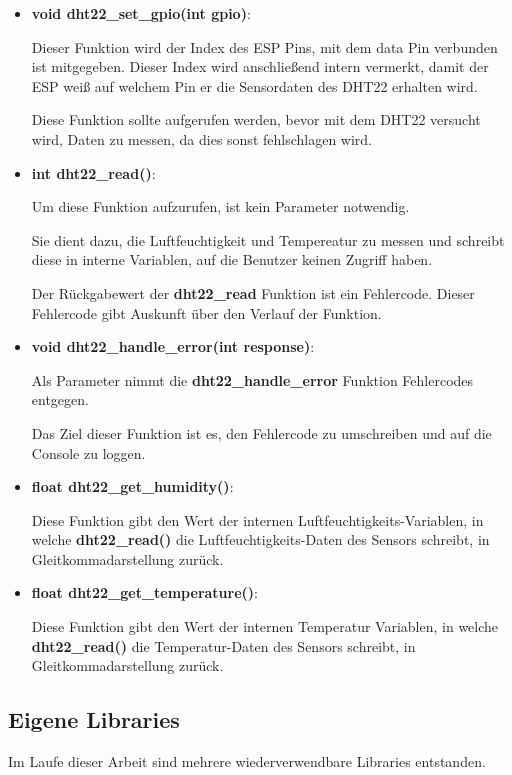 \begin{itemize}
    \item \textbf{void dht22\_set\_gpio(int gpio)}:

    Dieser Funktion wird der Index des ESP Pins, mit dem data Pin verbunden ist mitgegeben. Dieser Index wird anschließend intern vermerkt, damit der ESP weiß auf welchem Pin er die Sensordaten des DHT22 erhalten wird.
    
    Diese Funktion sollte aufgerufen werden, bevor mit dem DHT22 versucht wird, Daten zu messen, da dies sonst fehlschlagen wird.
    \item \textbf{int dht22\_read()}:

    Um diese Funktion aufzurufen, ist kein Parameter notwendig.

    Sie dient dazu, die Luftfeuchtigkeit und Tempereatur zu messen und schreibt diese in interne Variablen, auf die Benutzer keinen Zugriff haben.

    Der Rückgabewert der \textbf{dht22\_read} Funktion ist ein Fehlercode. Dieser Fehlercode gibt Auskunft über den Verlauf der Funktion.
    \item \textbf{void dht22\_handle\_error(int response)}:

    Als Parameter nimmt die \textbf{dht22\_handle\_error} Funktion Fehlercodes entgegen.

    Das Ziel dieser Funktion ist es, den Fehlercode zu umschreiben und auf die Console zu loggen.
    \item \textbf{float dht22\_get\_humidity()}:

    Diese Funktion gibt den Wert der internen Luftfeuchtigkeits-Variablen, in welche \textbf{dht22\_read()} die Luftfeuchtigkeits-Daten des Sensors schreibt, in Gleitkommadarstellung zurück.
    \item \textbf{float dht22\_get\_temperature()}:

    Diese Funktion gibt den Wert der internen Temperatur Variablen, in welche \linebreak \textbf{dht22\_read()} die Temperatur-Daten des Sensors schreibt, in Gleitkommadarstellung zurück.
\end{itemize}
\cite{dht22-lib}

\subsection{Eigene Libraries}\label{sec:own-libraries}

Im Laufe dieser Arbeit sind mehrere wiederverwendbare Libraries entstanden.

